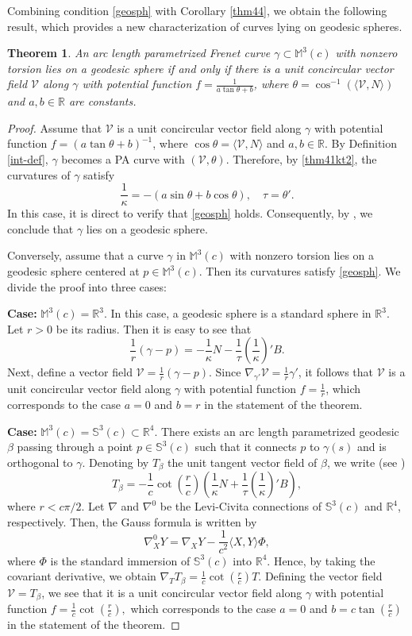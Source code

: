 \documentclass[12pt]{amsart}
\def\r{\mathbb R}
\def\m{\mathbb M}
\def\s{\mathbb S}
\def\v{\mathcal V}
\newtheorem{theorem}{Theorem}[section]
\theoremstyle{definition}
\begin{document}
Combining condition \eqref{geosph} with Corollary \ref{thm44}, we obtain the following result, which provides a new characterization of curves lying on geodesic spheres.


\begin{theorem}\label{thm44spherical}
An arc length parametrized Frenet curve $\gamma\subset\m^3(c)$ with nonzero torsion lies on a geodesic sphere if and only if there is a unit concircular vector field $\v$ along $\gamma$ with potential function $f=\frac{1}{a\tan \theta +b}$, where $\theta=\cos^{-1}(\langle \v,N\rangle)$ and $a,b\in \r$ are constants.
\end{theorem}
\begin{proof}
Assume that $\v$ is a unit concircular vector field along $\gamma$ with potential function $f=(a\tan \theta + b)^{-1}$, where $\cos\theta=\langle \v, N\rangle$ and $a,b\in \r$. By Definition \ref{int-def}, $\gamma$ becomes a PA curve with $(\v,\theta)$. Therefore, by \eqref{thm41kt2}, the curvatures of $\gamma$ satisfy
$$
\frac{1}{\kappa}=-(a\sin \theta + b\cos \theta), \quad \tau=\theta'.
$$
In this case, it is direct to verify that \eqref{geosph} holds. Consequently, by \cite[Theorem 4]{dgd1}, we conclude that $\gamma$ lies on a geodesic sphere.

Conversely, assume that a curve $\gamma$ in $\m^3(c)$ with nonzero torsion lies on a geodesic sphere centered at $p\in\m^3(c)$. Then its curvatures satisfy \eqref{geosph}. We divide the proof into three cases:

\textbf{Case:} $\m^3(c)=\r^3$. In this case, a geodesic sphere is a standard sphere in $\r^3$. Let $r>0$ be its radius. Then it is easy to see that
$$
\frac{1}{r}(\gamma-p)=-\frac{1}{\kappa} N-\frac{1}{\tau} \left (\frac{1}{\kappa} \right )' B.
$$
Next, define a vector field $\v=\frac{1}{r}(\gamma-p)$. Since $\nabla_{\gamma'}\v=\frac{1}{r}\gamma'$, it follows that $\v$ is a unit concircular vector field along $\gamma$ with potential function $f=\frac{1}{r}$, which corresponds to the case $a=0$ and $b=r$ in the statement of the theorem.

\textbf{Case:} $\m^3(c)=\s^3(c)\subset \r^4$. There exists an arc length parametrized geodesic $\beta$ passing through a point $p\in \s^3(c)$ such that it connects $p$ to $\gamma(s)$ and is orthogonal to $\gamma$. Denoting by $T_\beta$ the unit tangent vector field of $\beta$, we write (see \cite[Equation (27)]{dgd1})
$$
T_\beta=-\frac{1}{c}\cot\left (\frac{r}{c} \right) \left ( \frac{1}{\kappa}N+\frac{1}{\tau} \left (\frac{1}{\kappa} \right )' B \right ),
$$
where $r<c\pi/2$. Let $\nabla$ and $\nabla^0$ be the Levi-Civita connections of $\s^3(c)$ and $\r^4$, respectively. Then, the Gauss formula is written by
$$
\nabla^0_XY=\nabla_XY-\frac{1}{c^2}\langle X,Y\rangle \Phi,
$$
where $\Phi$ is the standard immersion of $\s^3(c)$ into $\r^4$. Hence, by taking the covariant derivative, we obtain  $\nabla_T T_\beta=\frac{1}{c}\cot\left (\frac{r}{c} \right) T.$ Defining the vector field $\v=T_\beta$, we see that it is a unit concircular vector field along $\gamma$ with potential function $f=\frac{1}{c}\cot\left (\frac{r}{c} \right),$ which corresponds to the case $a=0$ and $b=c\tan\left (\frac{r}{c} \right)$ in the statement of the theorem.


\end{proof}
\end{document}

